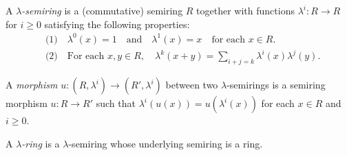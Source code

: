 A \emph{$\lambda$-semiring} is a (commutative) semiring $R$ together with functions $\lambda^i: R \to R$ for $i \geq 0$ satisfying the following properties:
\[
\begin{aligned}
&\text{(1)}\quad \lambda^0(x) = 1 \quad\text{and}\quad \lambda^1(x) = x \quad\text{for each } x \in R.\\
&\text{(2)}\quad \text{For each } x, y \in R,\quad \lambda^k(x + y) = \sum_{i+j=k} \lambda^i(x)\lambda^j(y).
\end{aligned}
\]

A \emph{morphism} $u: (R, \lambda^i) \to (R', \lambda^i)$ between two $\lambda$-semirings is a semiring morphism $u: R \to R'$ such that $\lambda^i(u(x)) = u(\lambda^i(x))$ for each $x \in R$ and $i \geq 0$.

A \emph{$\lambda$-ring} is a $\lambda$-semiring whose underlying semiring is a ring.

